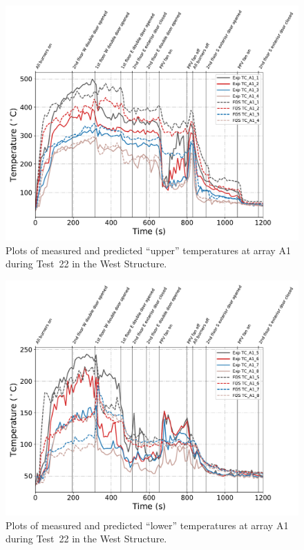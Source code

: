 \begin{figure}[!h]
	\centering
	\includegraphics[width=\columnwidth]{Figures/Plots/Validation/Temperature/Test_22_TC_A1_upper}
	\caption{Plots of measured and predicted ``upper'' temperatures at array A1 during Test~22 in the West Structure.}
	\label{fig:TCA1_upper_data_Test22}
\end{figure}
\begin{figure}[!h]
	\centering
	\includegraphics[width=\columnwidth]{Figures/Plots/Validation/Temperature/Test_22_TC_A1_lower}
	\caption{Plots of measured and predicted ``lower'' temperatures at array A1 during Test~22 in the West Structure.}
	\label{fig:TCA1_lower_data_Test22}
\end{figure}

